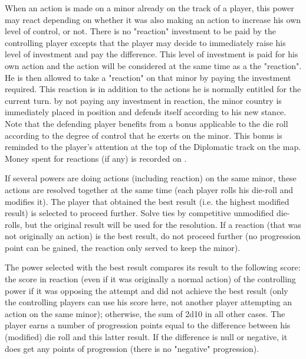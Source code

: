 \bparag When an action is made on a minor already on the track of a player,
this power may react depending on whether it was also making an action to
increase his own level of control, or not.
 There is no "reaction" investment to
be paid by the controlling player excepts that the player may decide to
immediately raise his level of investment and pay the difference. This level
of investment is paid for his own action and the action will be considered at
the same time as a the "reaction".
 He is then allowed to take a "reaction" on that minor by paying the
investment required. This reaction is in addition to the actions he is
normally entitled for the current turn.
 by not paying any investment in reaction, the minor country is
immediately placed in \Neutral position and defends itself according to his
new \Neutral stance.
\bparag Note that the defending player benefits from a bonus applicable to the
die roll according to the degree of control that he exerts on the minor.  This
bonus is reminded to the player's attention at the top of the Diplomatic track
on the map.
\bparag Money spent for reactions (if any) is recorded on
.

If several powers are doing actions (including reaction) on the same minor,
these actions are resolved together at the same time (each player rolls his
die-roll and modifies it). The player that obtained the best result (i.e. the
highest modified result) is selected to proceed further.
\bparag Solve ties by competitive unmodified die-rolls, but the original
result will be used for the resolution.
\bparag If a reaction (that was not originally an action) is the best result,
do not proceed further (no progression point can be gained, the reaction only
served to keep the minor).

The power selected with the best result compares its result to the following
score:
\bparag the score in reaction (even if it was originally a normal action) of
the controlling power if it was opposing the attempt and did not achieve the
best result (only the controlling players can use his score here, not another
player attempting an action on the same minor);
\bparag otherwise, the sum of 2d10 in all other cases.
\bparag The player earns a number of progression points equal to the
difference between his (modified) die roll and this latter result.
\bparag If the difference is null or negative, it does get any points of
progression (there is no "negative" progression).

